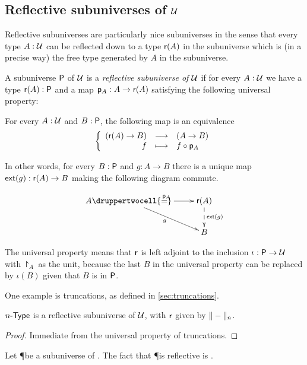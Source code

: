 \subsection{Reflective subuniverses of $\type$}

Reflective subuniverses are particularly nice subuniverses in the sense that
every type $A:\type$ can be reflected down to a type $\reflect(A)$ in the
subuniverse which is (in a precise way) the free type generated by $A$ in the
subuniverse.

\begin{defn}
  A subuniverse $\P$ of $\type$ is a \emph{reflective subuniverse of $\type$} if
  for every $A:\type$ we have a type $\reflect(A):\P$ and a map
  $\project_A:A\to\reflect(A)$ satisfying the following universal property:

  For every $A:\type$ and $B:\P$, the following map is an equivalence
  \[\function{(\reflect(A)\to{}B)}{(A\to{}B)}{f}{f\circ\project_A}\]

  In other words, for every $B:\P$ and $g:A\to{}B$ there is a unique map
  $\ext(g):\reflect(A)\to{}B$ making the following diagram commute.

  \[\uppercurveobject{{ }}\lowercurveobject{{ }}\twocellhead{{ }}
  \xymatrix{A \ar^{\project_A}[r] \ar_g[rd] \druppertwocell{=} & \reflect(A)
    \ar@{-->}^{\ext(g)}[d] \\
    & B}\]
\end{defn}

The universal property means that $\reflect$ is left adjoint to the inclusion
$\iota:\P\to\type$ with $\project_A$ as the unit, because the last $B$ in the
universal property can be replaced by $\iota(B)$ given that $B$ is in $\P$.

One example is truncations, as defined in \autoref{sec:truncations}.
\begin{lem}
  $\typele{n}$ is a reflective subuniverse of $\type$, with $\reflect$
  given by $\trunc{n}{-}$.
\end{lem}
\begin{proof}
Immediate from the universal property of truncations.  
\end{proof}

\begin{lem}
  Let \P be a subuniverse of \type. The fact that \P is reflective is \anhprop.
\end{lem}

